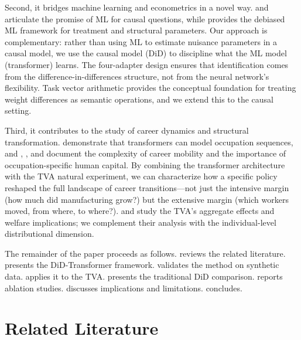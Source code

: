 \documentclass[12pt]{article}
\begin{document}
Second, it bridges machine learning and econometrics in a novel way. \citet{atheyImbens2019} and \citet{mullainathan2017machine} articulate the promise of ML for causal questions, while \citet{chernozhukov2018double} provides the debiased ML framework for treatment and structural parameters. Our approach is complementary: rather than using ML to estimate nuisance parameters in a causal model, we use the causal model (DiD) to discipline what the ML model (transformer) learns. The four-adapter design ensures that identification comes from the difference-in-differences structure, not from the neural network's flexibility. Task vector arithmetic \citep{ilharco2023editing} provides the conceptual foundation for treating weight differences as semantic operations, and we extend this to the causal setting.

Third, it contributes to the study of career dynamics and structural transformation. \citet{vafa2022career} demonstrate that transformers can model occupation sequences, and \citet{neal1999complexity}, \citet{kambourovManovskii2009}, and \citet{gathmann2010much} document the complexity of career mobility and the importance of occupation-specific human capital. By combining the transformer architecture with the TVA natural experiment, we can characterize how a specific policy reshaped the full landscape of career transitions---not just the intensive margin (how much did manufacturing grow?) but the extensive margin (which workers moved, from where, to where?). \citet{klineMoretti2014local} and \citet{klineMoretti2014} study the TVA's aggregate effects and welfare implications; we complement their analysis with the individual-level distributional dimension.

The remainder of the paper proceeds as follows.  reviews the related literature.  presents the DiD-Transformer framework.  validates the method on synthetic data.  applies it to the TVA.  presents the traditional DiD comparison.  reports ablation studies.  discusses implications and limitations.  concludes.


\section{Related Literature}\label{sec:literature}
\end{document}
